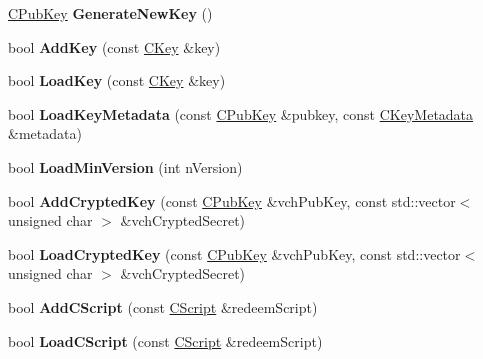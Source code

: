 \begin{DoxyCompactItemize}
\item 
\mbox{\label{class_c_wallet_a061fe7f54f80ec40f856b3e6365c2f4a}} 
\mbox{\hyperlink{class_c_pub_key}{C\+Pub\+Key}} {\bfseries Generate\+New\+Key} ()
\item 
\mbox{\label{class_c_wallet_a246d5532152777aeb04e7dfa01350b97}} 
bool {\bfseries Add\+Key} (const \mbox{\hyperlink{class_c_key}{C\+Key}} \&key)
\item 
\mbox{\label{class_c_wallet_a94c9cdf069f0bb17c09aca0580271359}} 
bool {\bfseries Load\+Key} (const \mbox{\hyperlink{class_c_key}{C\+Key}} \&key)
\item 
\mbox{\label{class_c_wallet_a21e6580474514f838dfe1446890085a4}} 
bool {\bfseries Load\+Key\+Metadata} (const \mbox{\hyperlink{class_c_pub_key}{C\+Pub\+Key}} \&pubkey, const \mbox{\hyperlink{class_c_key_metadata}{C\+Key\+Metadata}} \&metadata)
\item 
\mbox{\label{class_c_wallet_a88317da8dab80135b8db73e945e15b60}} 
bool {\bfseries Load\+Min\+Version} (int n\+Version)
\item 
\mbox{\label{class_c_wallet_a3e90096a903d49cd751f05fcdb7692ce}} 
bool {\bfseries Add\+Crypted\+Key} (const \mbox{\hyperlink{class_c_pub_key}{C\+Pub\+Key}} \&vch\+Pub\+Key, const std\+::vector$<$ unsigned char $>$ \&vch\+Crypted\+Secret)
\item 
\mbox{\label{class_c_wallet_a01fbd78238d4ef833d059f12a7e8ac9f}} 
bool {\bfseries Load\+Crypted\+Key} (const \mbox{\hyperlink{class_c_pub_key}{C\+Pub\+Key}} \&vch\+Pub\+Key, const std\+::vector$<$ unsigned char $>$ \&vch\+Crypted\+Secret)
\item 
\mbox{\label{class_c_wallet_ad7edacad1c926bc4b7fe0dc1be95ce31}} 
bool {\bfseries Add\+C\+Script} (const \mbox{\hyperlink{class_c_script}{C\+Script}} \&redeem\+Script)
\item 
\mbox{\label{class_c_wallet_adbf0abef9da8102f000d4afd5cec5bbc}} 
bool {\bfseries Load\+C\+Script} (const \mbox{\hyperlink{class_c_script}{C\+Script}} \&redeem\+Script)
\item 

\end{DoxyCompactItemize}
